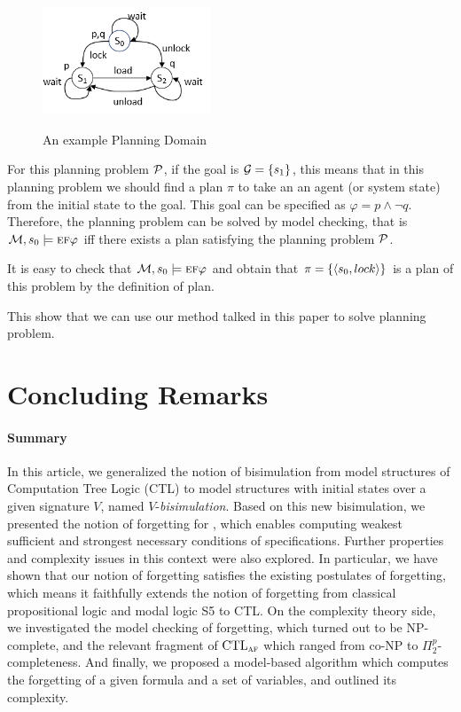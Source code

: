 \documentclass[letterpaper]{article} %
\begin{document}
\begin{example}
 \begin{figure}[ht]
  \centering
  \includegraphics[width=5cm]{PlanningDomain.png}\\
  \caption{An example Planning Domain}\label{PD}
\end{figure}

For this planning problem $\cal P$, if the goal is ${\cal G} = \{s_1\}$, this means that in this planning problem we should find a plan $\pi$ to take an an agent (or system state) from the initial state to the goal. This goal can be specified as $\varphi = p \wedge \neg q$.
Therefore, the planning problem can be solved by model checking, that is ${\cal M}, s_0 \models \textsc{e} \textsc{f} \varphi$ iff there exists a plan satisfying the planning problem $\cal P$.

It is easy to check that ${\cal M}, s_0 \models \textsc{e} \textsc{f} \varphi$ and obtain that $\pi=\{{\langle{s_0, lock}\rangle}\}$ is a plan of this problem by the definition of plan.

 \end{example}

This show that we can use our method talked in this paper to solve planning problem.



\section{Concluding Remarks}
\paragraph{Summary}
In this article, we generalized the notion of bisimulation from model structures of Computation Tree Logic (CTL) to model structures with initial states over a given signature $V$, named $V$-{\em bisimulation}.
Based on this new bisimulation, we presented the notion of forgetting for \CTL, which enables computing weakest sufficient and strongest necessary conditions of specifications. Further properties and complexity issues in this context were also explored. In particular, we have shown that our notion of forgetting satisfies the existing postulates of forgetting, which means it faithfully extends the notion of forgetting from classical propositional logic and modal logic S5 to CTL. On the complexity theory side, we investigated the model checking of forgetting, which turned out to be NP-complete, and the relevant fragment of $\textrm{CTL}_{\textsc{a}\textsc{f}}$ which ranged from co-NP to $\Pi_2^p$-completeness.  And finally, we proposed a model-based algorithm which computes the forgetting of a given formula and a set of variables, and outlined its complexity.
\end{document}
